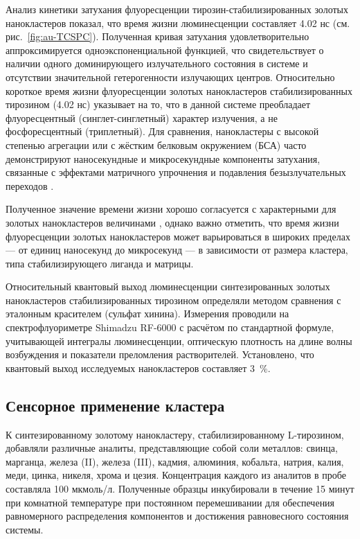 \documentclass[a4paper, 12pt]{article}
\begin{document}
\begin{onehalfspace}
	Анализ кинетики затухания флуоресценции тирозин-стабилизированных золотых нанокластеров показал, что время жизни люминесценции составляет 4.02 нс (см. рис.~\ref{fig:au-TCSPC}). Полученная кривая затухания удовлетворительно аппроксимируется одноэкспоненциальной функцией, что свидетельствует о наличии одного доминирующего излучательного состояния в системе и отсутствии значительной гетерогенности излучающих центров.
	Относительно короткое время жизни флуоресценции золотых нанокластеров стабилизированных тирозином (4.02 нс) указывает на то, что в данной системе преобладает флуоресцентный (синглет-синглетный) характер излучения, а не фосфоресцентный (триплетный). Для сравнения, нанокластеры с высокой степенью агрегации или с жёстким белковым окружением (БСА) часто демонстрируют наносекундные и микросекундные компоненты затухания, связанные с эффектами матричного упрочнения и подавления безызлучательных переходов \cite{bsa-lifetime}.

	Полученное значение времени жизни хорошо согласуется с характерными для золотых нанокластеров величинами \cite{tyr-lifetime}, однако важно отметить, что время жизни флуоресценции золотых нанокластеров может варьироваться в широких пределах — от единиц наносекунд до микросекунд — в зависимости от размера кластера, типа стабилизирующего лиганда и матрицы.

	Относительный квантовый выход люминесценции синтезированных золотых нанокластеров стабилизированных тирозином определяли методом сравнения с эталонным красителем (сульфат хинина). Измерения проводили на спектрофлуориметре Shimadzu RF-6000 с расчётом по стандартной формуле, учитывающей интегралы люминесценции, оптическую плотность на длине волны возбуждения и показатели преломления растворителей. Установлено, что квантовый выход исследуемых нанокластеров составляет 3~\%.

\subsection*{Сенсорное применение кластера}

	К синтезированному золотому нанокластеру, стабилизированному L-тирозином, добавляли различные аналиты, представляющие собой соли металлов: свинца, марганца, железа (II), железа (III), кадмия, алюминия, кобальта, натрия, калия, меди, цинка, никеля, хрома и цезия. Концентрация каждого из аналитов в пробе составляла 100 мкмоль/л. Полученные образцы инкубировали в течение 15 минут при комнатной температуре при постоянном перемешивании для обеспечения равномерного распределения компонентов и достижения равновесного состояния системы.


\end{onehalfspace}
\end{document}
